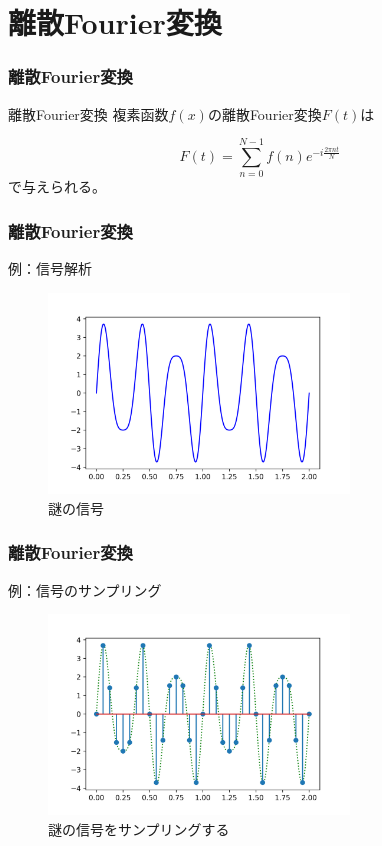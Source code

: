 \documentclass[dvipdfmx,11pt,notheorems]{beamer}
\theoremstyle{definition}
\begin{document}
\section{離散Fourier変換}

\begin{frame}[fragile]\frametitle{離散Fourier変換}

\begin{block}{離散Fourier変換}
複素函数$f(x)$の離散Fourier変換$F(t)$は

\begin{equation*}
F(t) = \sum^{N-1}_{n=0}f(n)e^{-i \frac{2\pi n  t }{N}}
\end{equation*}
で与えられる。
\end{block}

\end{frame}

\begin{frame}[fragile]\frametitle{離散Fourier変換}

\begin{block}{例：信号解析}
\begin{figure}
  \centering
  \includegraphics[width=8cm]{sine_curve.png}
  \caption{謎の信号}
\end{figure}

\end{block}
\end{frame}

\begin{frame}[fragile]\frametitle{離散Fourier変換}

\begin{block}{例：信号のサンプリング}
\begin{figure}
  \centering
  \includegraphics[width=8cm]{sampling.png}
  \caption{謎の信号をサンプリングする}
\end{figure}

\end{block}
\end{frame}
\end{document}
